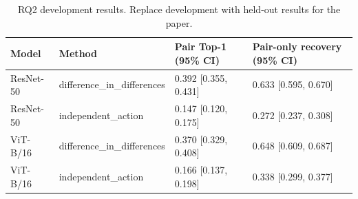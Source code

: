 \begin{table}[t]
\centering
\caption{RQ2 development results. Replace development with held-out results for the paper.}
\label{tab:rq2}
\begin{tabular}{llll}
\toprule
Model & Method & Pair Top-1 (95\% CI) & Pair-only recovery (95\% CI) \\
\midrule
ResNet-50 & difference\_in\_differences & 0.392 [0.355, 0.431] & 0.633 [0.595, 0.670] \\
ResNet-50 & independent\_action & 0.147 [0.120, 0.175] & 0.272 [0.237, 0.308] \\
ViT-B/16 & difference\_in\_differences & 0.370 [0.329, 0.408] & 0.648 [0.609, 0.687] \\
ViT-B/16 & independent\_action & 0.166 [0.137, 0.198] & 0.338 [0.299, 0.377] \\
\bottomrule
\end{tabular}
\end{table}
